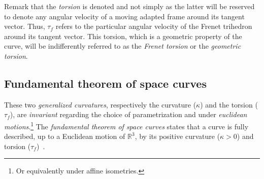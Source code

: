Remark that the \emph{torsion} is denoted  and not simply \textquote{$\tau$} as the latter will be reserved to denote any angular velocity of a moving adapted frame around its tangent vector. Thus, $\tau_f$ refers to the particular angular velocity of the Frenet trihedron around its tangent vector. This torsion, which is a geometric property of the curve, will be indifferently referred to as the \emph{Frenet torsion} or the \emph{geometric torsion}.




\subsection{Fundamental theorem of space curves}\label{sec=fundamental}
These two \emph{generalized curvatures}, respectively the curvature ($\kappa$) and the torsion ($\tau_f$), are \emph{invariant} regarding the choice of parametrization and under \emph{euclidean motions}.\footnote{Or equivalently under affine isometries.} The \emph{fundamental theorem of space curves} states that a curve is fully described, up to a Euclidean motion of ${\mathbb{R}}^3$, by its positive curvature ($\kappa > 0$) and torsion ($\tau_f$)~\cite[p.229]{Gray2006}.

